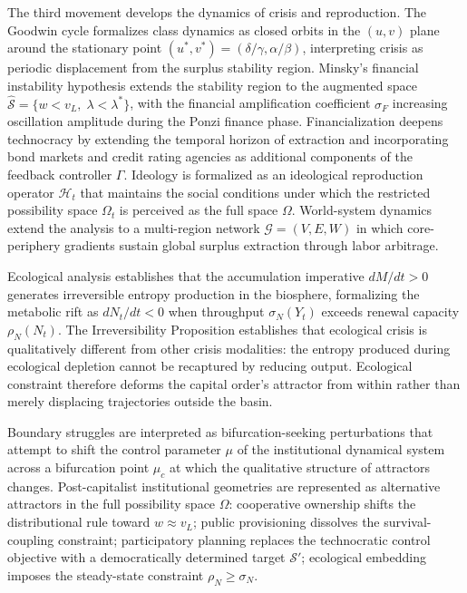 \documentclass[12pt,a4paper]{article}
\theoremstyle{definition}
\theoremstyle{remark}
\begin{document}
The third movement develops the dynamics of crisis and reproduction. The Goodwin cycle formalizes class dynamics as closed orbits in the $(u, v)$ plane around the stationary point $(u^*, v^*) = (\delta/\gamma, \alpha/\beta)$, interpreting crisis as periodic displacement from the surplus stability region. Minsky's financial instability hypothesis extends the stability region to the augmented space $\hat{\mathcal{S}} = \{w < v_L,\; \lambda < \lambda^*\}$, with the financial amplification coefficient $\sigma_F$ increasing oscillation amplitude during the Ponzi finance phase. Financialization deepens technocracy by extending the temporal horizon of extraction and incorporating bond markets and credit rating agencies as additional components of the feedback controller $\Gamma$. Ideology is formalized as an ideological reproduction operator $\mathcal{H}_t$ that maintains the social conditions under which the restricted possibility space $\Omega_t$ is perceived as the full space $\Omega$. World-system dynamics extend the analysis to a multi-region network $\mathcal{G} = (V, E, W)$ in which core-periphery gradients sustain global surplus extraction through labor arbitrage.

Ecological analysis establishes that the accumulation imperative $dM/dt > 0$ generates irreversible entropy production in the biosphere, formalizing the metabolic rift as $dN_t/dt < 0$ when throughput $\sigma_N(Y_t)$ exceeds renewal capacity $\rho_N(N_t)$. The Irreversibility Proposition establishes that ecological crisis is qualitatively different from other crisis modalities: the entropy produced during ecological depletion cannot be recaptured by reducing output. Ecological constraint therefore deforms the capital order's attractor from within rather than merely displacing trajectories outside the basin.

Boundary struggles are interpreted as bifurcation-seeking perturbations that attempt to shift the control parameter $\mu$ of the institutional dynamical system across a bifurcation point $\mu_c$ at which the qualitative structure of attractors changes. Post-capitalist institutional geometries are represented as alternative attractors in the full possibility space $\Omega$: cooperative ownership shifts the distributional rule toward $w \approx v_L$; public provisioning dissolves the survival-coupling constraint; participatory planning replaces the technocratic control objective with a democratically determined target $\mathcal{S}'$; ecological embedding imposes the steady-state constraint $\rho_N \geq \sigma_N$.
\end{document}
